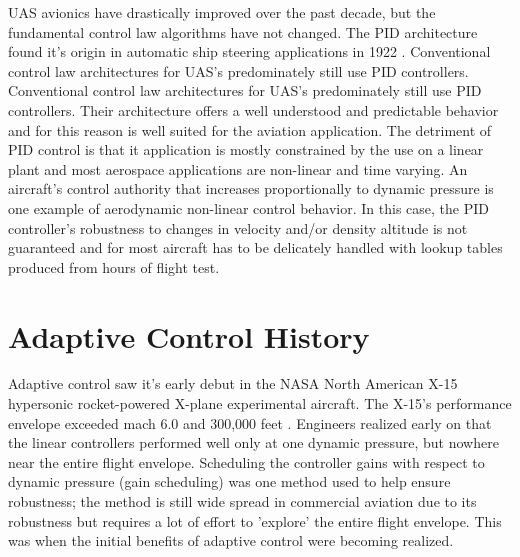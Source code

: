 \ac{UAS} avionics have drastically improved over the past decade, but the fundamental control law algorithms have not changed.  The \ac{PID} architecture found it's origin in automatic ship steering applications in 1922 \cite{minorsky1922pid}.  Conventional control law architectures for \ac{UAS}'s predominately still use \ac{PID} controllers.  Conventional control law architectures for \ac{UAS}'s predominately still use \ac{PID} controllers.  Their architecture offers a well understood and predictable behavior and for this reason is well suited for the aviation application.  The detriment of \ac{PID} control is that it application is mostly constrained by the use on a linear plant and most aerospace applications are non-linear and time varying.   An aircraft's control authority that increases proportionally to dynamic pressure is one example of aerodynamic non-linear control behavior.  In this case, the \ac{PID} controller's robustness to changes in velocity and/or density altitude is not guaranteed and for most aircraft has to be delicately handled with lookup tables produced from hours of flight test.



\section{Adaptive Control History}\label{history}
Adaptive control saw it's early debut in the NASA North American X-15 hypersonic rocket-powered X-plane experimental aircraft.  The X-15's performance envelope exceeded mach 6.0 and 300,000 feet \cite{jenkins2000x15specs}.  Engineers realized early on that the linear controllers performed well only at one dynamic pressure, but nowhere near the entire flight envelope.  Scheduling the controller gains with respect to dynamic pressure (gain scheduling) was one method used to help ensure robustness;  the method is still wide spread in commercial aviation due to its robustness but requires a lot of effort to 'explore' the entire flight envelope.  This was when the initial benefits of adaptive control were becoming realized.

